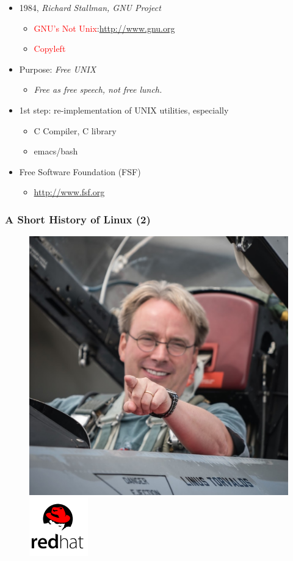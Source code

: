 \documentclass[red]{beamer}
\begin{document}
\begin{CJK*}{UTF8}{gbsn}
\begin{frame}
\begin{itemize}
    \item 1984, \emph{Richard Stallman, GNU Project}
    \begin{itemize}
        \item \textcolor{red}{GNU's Not Unix}:\url{http://www.gnu.org}
        \item \textcolor{red}{Copyleft}
    \end{itemize}
    \item Purpose: \emph{Free UNIX}
    \begin{itemize}
        \item \emph{Free as free speech, not free lunch.}
    \end{itemize}
    \item 1st step: re-implementation of UNIX utilities, especially
    \begin{itemize}
        \item C Compiler, C library
        \item emacs/bash
    \end{itemize}
    \item Free Software Foundation (FSF)
    \begin{itemize}
        \item \url{http://www.fsf.org}
    \end{itemize}
\end{itemize}
\end{frame}

\begin{frame}
\frametitle{A Short History of Linux (2)}
\begin{figure}
  \includegraphics[width=.80in]{images/torvalds.jpg}
  \includegraphics[width=1in]{images/redhat.png}
\end{figure}


\end{frame}
\end{CJK*}
\end{document}

